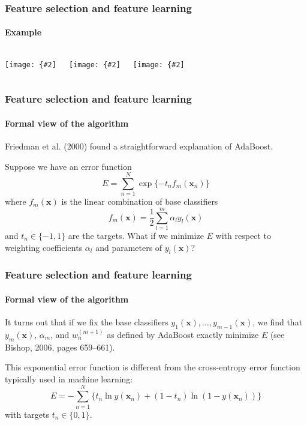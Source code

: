 \documentclass[aspectratio=169]{beamer}
\renewcommand{\vec}[1]{\boldsymbol{#1}}
\newcommand{\myfig}[3]{\centerline{\texttt{[image: \{\#2]}}}
\begin{document}
\begin{frame}
\frametitle{Feature selection and feature learning}
\framesubtitle{Example}

\begin{columns}
\column{1.5in}
\myfig{1.6in}{Bishop-fig14-2d.pdf}{}
\column{1.5in}
\myfig{1.6in}{Bishop-fig14-2e.pdf}{Bishop (2006), Fig.\ 14.2(d)-(f)}
\column{1.5in}
\myfig{1.6in}{Bishop-fig14-2f.pdf}{}
\end{columns}

\end{frame}


\begin{frame}
\frametitle{Feature selection and feature learning}
\framesubtitle{Formal view of the algorithm}

Friedman et al. (2000) found a straightforward explanation of
AdaBoost.

\medskip

Suppose we have an error function
\begin{equation*}
E = \sum_{n=1}^N \exp \{ -t_n f_m(\vec{x}_n) \}
\end{equation*}
where $f_m(\vec{x})$ is the linear combination of base classifiers
\begin{equation*}
f_m(\vec{x}) = \frac{1}{2} \sum_{l=1}^m \alpha_l y_l(\vec{x})
\end{equation*}
and $t_n \in \{-1,1\}$ are the targets.  What if we minimize $E$ with
respect to weighting coefficients $\alpha_l$ and parameters of
$y_l(\vec{x})$?

\end{frame}


\begin{frame}
\frametitle{Feature selection and feature learning}
\framesubtitle{Formal view of the algorithm}

It turns out that if we fix the base classifiers
$y_1(\vec{x}),\ldots,y_{m-1}(\vec{x})$, we find that $y_m(\vec{x})$,
$\alpha_m$, and $w_n^{(m+1)}$ as defined by AdaBoost exactly minimize
$E$ (see Bishop, 2006, pages 659--661).

\medskip

This \alert{exponential error function} is different from the
\alert{cross-entropy} error function typically used in machine learning:
\begin{equation*}
E = -\sum_{n=1}^N \{ t_n \ln y(\vec{x}_n) + (1-t_n)\ln (1-y(\vec{x}_n)) \}
\end{equation*}
with targets $t_n \in \{0,1\}$.

\end{frame}
\end{document}
